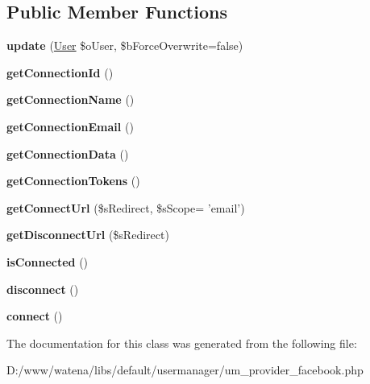 \subsection*{Public Member Functions}
\begin{DoxyCompactItemize}
\item 
\hypertarget{class_provider_facebook_ae45aa7f883ee740e96531f81e75f2f36}{{\bfseries update} (\hyperlink{class_user}{User} \$o\-User, \$b\-Force\-Overwrite=false)}\label{class_provider_facebook_ae45aa7f883ee740e96531f81e75f2f36}

\item 
\hypertarget{class_provider_facebook_a48c372f29b8fd06f99a07b8cd2914a12}{{\bfseries get\-Connection\-Id} ()}\label{class_provider_facebook_a48c372f29b8fd06f99a07b8cd2914a12}

\item 
\hypertarget{class_provider_facebook_a5aeaa537b429c3bdd424624922b4c427}{{\bfseries get\-Connection\-Name} ()}\label{class_provider_facebook_a5aeaa537b429c3bdd424624922b4c427}

\item 
\hypertarget{class_provider_facebook_a95597efa581ece58e52a6724c3d64332}{{\bfseries get\-Connection\-Email} ()}\label{class_provider_facebook_a95597efa581ece58e52a6724c3d64332}

\item 
\hypertarget{class_provider_facebook_a014e63ad9b6b82094636280d030ab928}{{\bfseries get\-Connection\-Data} ()}\label{class_provider_facebook_a014e63ad9b6b82094636280d030ab928}

\item 
\hypertarget{class_provider_facebook_a5d5cea3239be75fced8bea329bab8e16}{{\bfseries get\-Connection\-Tokens} ()}\label{class_provider_facebook_a5d5cea3239be75fced8bea329bab8e16}

\item 
\hypertarget{class_provider_facebook_a52a0543c0e3eb23ae90323ae99bced78}{{\bfseries get\-Connect\-Url} (\$s\-Redirect, \$s\-Scope= 'email')}\label{class_provider_facebook_a52a0543c0e3eb23ae90323ae99bced78}

\item 
\hypertarget{class_provider_facebook_a1088872a774d170e4b1326bf933b4c15}{{\bfseries get\-Disconnect\-Url} (\$s\-Redirect)}\label{class_provider_facebook_a1088872a774d170e4b1326bf933b4c15}

\item 
\hypertarget{class_provider_facebook_a99568045793c97001b1dc3557a2c6031}{{\bfseries is\-Connected} ()}\label{class_provider_facebook_a99568045793c97001b1dc3557a2c6031}

\item 
\hypertarget{class_provider_facebook_a38fe21d6aacf89db912b571c8b31d848}{{\bfseries disconnect} ()}\label{class_provider_facebook_a38fe21d6aacf89db912b571c8b31d848}

\item 
\hypertarget{class_provider_facebook_a80eef261abff83fb6111ea1510feb09d}{{\bfseries connect} ()}\label{class_provider_facebook_a80eef261abff83fb6111ea1510feb09d}

\end{DoxyCompactItemize}


The documentation for this class was generated from the following file\-:\begin{DoxyCompactItemize}
\item 
D\-:/www/watena/libs/default/usermanager/um\-\_\-provider\-\_\-facebook.\-php\end{DoxyCompactItemize}
